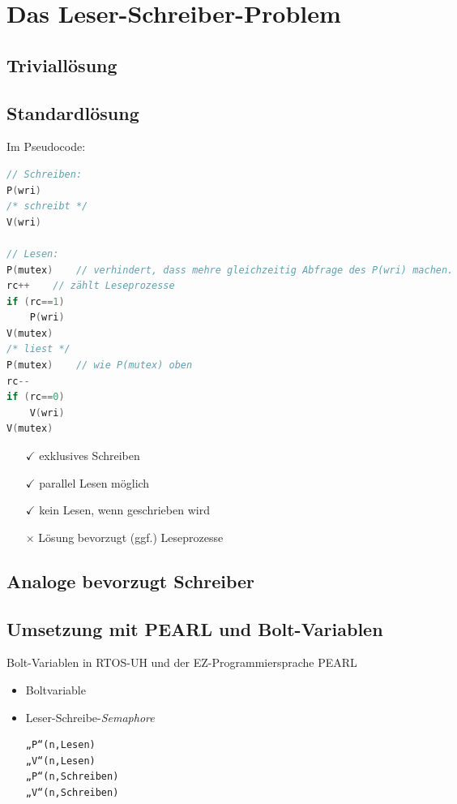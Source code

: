 \section{Das Leser-Schreiber-Problem}

\subsection{Triviallösung}

\subsection{Standardlösung}
%
Im Pseudocode:
\begin{lstlisting}[language=C]
// Schreiben: 
P(wri)
/* schreibt */
V(wri)

// Lesen:
P(mutex)	// verhindert, dass mehre gleichzeitig Abfrage des P(wri) machen.
rc++	// zählt Leseprozesse
if (rc==1)
	P(wri)
V(mutex)
/* liest */
P(mutex)	// wie P(mutex) oben
rc--
if (rc==0)
	V(wri)
V(mutex)
\end{lstlisting}
\begin{itemize}
\item[$\checkmark$] exklusives Schreiben
\item[$\checkmark$] parallel Lesen möglich
\item[$\checkmark$] kein Lesen, wenn geschrieben wird
\item[$\times$] Lösung bevorzugt (ggf.) Leseprozesse
\end{itemize}

\subsection{Analoge bevorzugt Schreiber}

\subsection{Umsetzung mit PEARL und Bolt-Variablen}
Bolt-Variablen in RTOS-UH und der EZ-Programmiersprache PEARL
\begin{itemize}
\item Boltvariable
\item Leser-Schreibe-\emph{Semaphore}
\begin{lstlisting}
„P“(n,Lesen)
„V“(n,Lesen)
„P“(n,Schreiben)
„V“(n,Schreiben)
\end{lstlisting}
\end{itemize}
